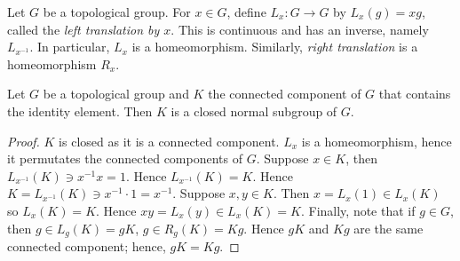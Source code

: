 Let $G$ be a topological group.
For $x \in G$, define $L_x: G \to G$ by $L_x(g) = xg$, called the
\emph{left translation by $x$}.
This is continuous and has an inverse,
namely $L_{x^{-1}}$.
In particular, $L_x$ is a homeomorphism.
Similarly, \emph{right translation} is a homeomorphism $R_x$.

\begin{proposition}[]
	Let $G$ be a topological group and $K$ the connected component of $G$ that
	contains the identity element.
	Then $K$ is a closed normal subgroup of $G$.
\end{proposition}

\begin{proof}
	$K$ is closed as it is a connected component.
	$L_x$ is a homeomorphism, hence it permutates the connected components
	of $G$.
	Suppose $x \in K$, then 
	$L_{x^{-1}}(K) \ni x^{-1} x = 1$. Hence $L_{x^{-1}}(K) = K$.
	Hence $K = L_{x^{-1}}(K) \ni x^{-1} \cdot 1 = x^{-1}$.
	Suppose $x, y \in K$.
	Then $x = L_x(1) \in L_x(K)$ so $L_x(K) = K$.
	Hence
	$xy = L_x(y) \in L_x(K) = K$.
	Finally,
	note that if $g \in G$, then $g \in L_g(K) = gK$, $g \in R_g(K) = Kg$.
	Hence $gK$ and $Kg$ are the same connected component; hence, $gK = Kg$.
\end{proof}

